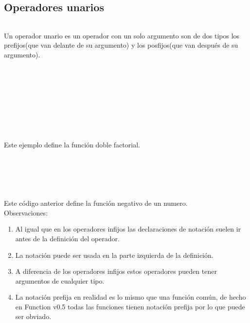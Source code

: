       \subsection*{Operadores unarios}\texttt{~}\\
      
      Un operador unario es un operador con un solo argumento son de dos tipos los prefijos(que van delante de su argumento) y los posfijos(que van después de su argumento).
      
      \begin{fxcode}
         \\
         \\
         \\
         \\
         \\
         \\
         \\
      \end{fxcode}
      
      Este ejemplo define la función doble factorial.
      
      \begin{fxcode}
         \\
      \end{fxcode}
      
      \begin{fxcode}
         \\
         \\
      \end{fxcode}
      
      Este código anterior define la función negativo de un numero.
      \\
      
      Observaciones:
      
      \begin{enumerate}
         \item Al igual que en los operadores infijos las declaraciones de notación suelen ir antes de la definición del operador.
         \item La notación puede ser usada en la parte izquierda de la definición.
         \item A diferencia de los operadores infijos estos operadores pueden tener argumentos de cualquier tipo.
         \item La notación prefija en realidad es lo mismo que una función común, de hecho en Function v0.5 todas las funciones tienen notación prefija por lo que puede ser obviado.
      \end{enumerate}
      
